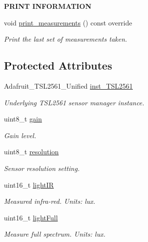 \begin{Indent}{\bf P\+R\+I\+NT I\+N\+F\+O\+R\+M\+A\+T\+I\+ON}\par
\begin{DoxyCompactItemize}
\item 
void \hyperlink{class_loom___t_s_l2561_ad2b5c1f922a5ecfda4509c0828c04315}{print\+\_\+measurements} () const override
\begin{DoxyCompactList}\small\item\em Print the last set of measurements taken. \end{DoxyCompactList}\end{DoxyCompactItemize}
\end{Indent}
\subsection*{Protected Attributes}
\begin{DoxyCompactItemize}
\item 
Adafruit\+\_\+\+T\+S\+L2561\+\_\+\+Unified \hyperlink{class_loom___t_s_l2561_a9e9a549aee3695274a46be5f85e8e54e}{inst\+\_\+\+T\+S\+L2561}
\begin{DoxyCompactList}\small\item\em Underlying T\+S\+L2561 sensor manager instance. \end{DoxyCompactList}\item 
uint8\+\_\+t \hyperlink{class_loom___t_s_l2561_a6a5848bae19a14f561d39ea447a999c4}{gain}
\begin{DoxyCompactList}\small\item\em Gain level. \end{DoxyCompactList}\item 
uint8\+\_\+t \hyperlink{class_loom___t_s_l2561_a600b48b5fa17b6777fa343cdf145f382}{resolution}
\begin{DoxyCompactList}\small\item\em Sensor resolution setting. \end{DoxyCompactList}\item 
uint16\+\_\+t \hyperlink{class_loom___t_s_l2561_a290105175178ce8cbc47d8d2b958d7f8}{light\+IR}
\begin{DoxyCompactList}\small\item\em Measured infra-\/red. Units\+: lux. \end{DoxyCompactList}\item 
uint16\+\_\+t \hyperlink{class_loom___t_s_l2561_a0b91894008dd82a63b4401794275fb2f}{light\+Full}
\begin{DoxyCompactList}\small\item\em Measure full spectrum. Units\+: lux. \end{DoxyCompactList}\end{DoxyCompactItemize}
